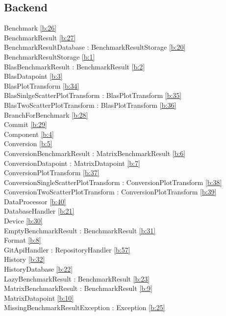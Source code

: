 \subsection{Backend}
Benchmark  \ref{b:26}\\
BenchmarkResult  \ref{b:27}\\
BenchmarkResultDatabase : BenchmarkResultStorage  \ref{b:20}\\
BenchmarkResultStorage \ref{b:1} \\
BlasBenchmarkResult : BenchmarkResult \ref{b:2} \\
BlasDatapoint \ref{b:3} \\
BlasPlotTransform  \ref{b:34}\\
BlasSinlgeScatterPlotTransform : BlasPlotTransform  \ref{b:35}\\
BlasTwoScatterPlotTransform : BlasPlotTransform  \ref{b:36}\\
BranchForBenchmark  \ref{b:28}\\
Commit  \ref{b:29}\\
Component \ref{b:4} \\
Conversion \ref{b:5} \\
ConversionBenchmarkResult : MatrixBenchmarkResult \ref{b:6} \\
ConversionDatapoint : MatrixDatapoint  \ref{b:7}\\
ConversionPlotTransform  \ref{b:37}\\
ConversionSingleScatterPlotTransform : ConversionPlotTransform  \ref{b:38}\\
ConversionTwoScatterPlotTransform : ConversionPlotTransform  \ref{b:39}\\
DataProcessor  \ref{b:40}\\
DatabaseHandler  \ref{b:21}\\
Device  \ref{b:30}\\
EmptyBenchmarkResult : BenchmarkResult  \ref{b:31}\\
Format  \ref{b:8}\\
GitApiHandler : RepositoryHandler  \ref{b:57}\\
History  \ref{b:32}\\
HistoryDatabase  \ref{b:22}\\
LazyBenchmarkResult : BenchmarkResult  \ref{b:23}\\
MatrixBenchmarkResult : BenchmarkResult  \ref{b:9}\\
MatrixDatapoint  \ref{b:10}\\
MissingBenchmarkResultException : Exception  \ref{b:25}\\
